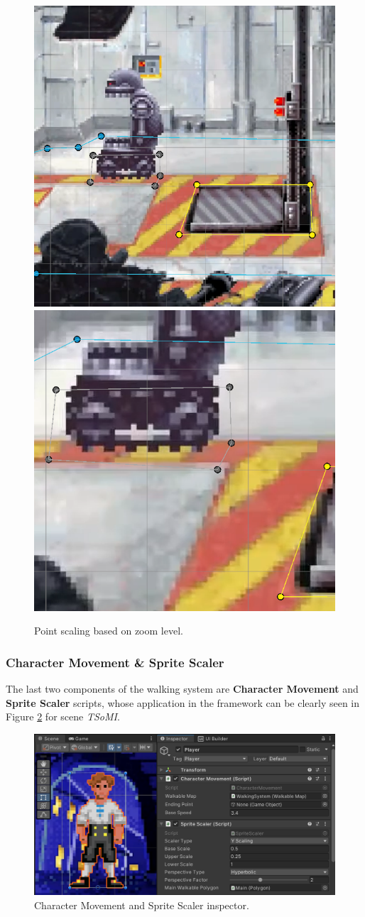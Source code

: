 \begin{figure}[H]
\centering
\includegraphics[width=.48\linewidth]{img/User doc/point_scaling.png}
\includegraphics[width=.48\linewidth]{img/User doc/point_scaling2.png}
\caption{Point scaling based on zoom level.}
\label{fig:Manual-Zoom}
\end{figure}

\subsubsection{Character Movement \& Sprite Scaler}
\label{Manual:ChM&SS}
The last two components of the walking system are \textbf{Character Movement} and \textbf{Sprite Scaler} scripts, whose application in the framework can be clearly seen in Figure \ref{fig:Manual-ChM&SS} for scene \textit{TSoMI}. 

\begin{figure}[H]
\centering
\includegraphics[width=0.9\linewidth]{img/User doc/character_movement.png}
\caption{Character Movement and Sprite Scaler inspector.}
\label{fig:Manual-ChM&SS}
\end{figure}


